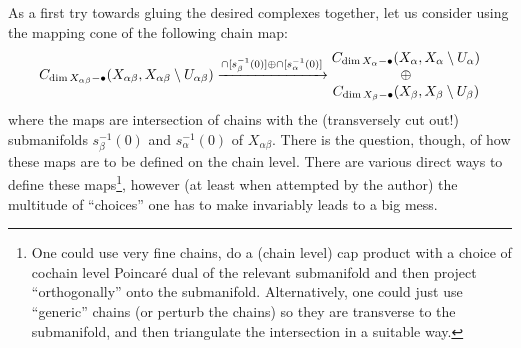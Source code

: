 \documentclass[12pt]{article}
\theoremstyle{definition}
\theoremstyle{remark}
\numberwithin{equation}{subsection}
\begin{document}
As a first try towards gluing the desired complexes together, let us consider using the mapping cone of the following chain map:
\begin{equation}\label{mappingconefirsttry}
C_{\dim X_{\alpha\beta}-\bullet}(X_{\alpha\beta},X_{\alpha\beta}\setminus U_{\alpha\beta})\xrightarrow{\cap[s_\beta^{-1}(0)]\oplus\cap[s_\alpha^{-1}(0)]}\begin{matrix}C_{\dim X_\alpha-\bullet}(X_\alpha,X_\alpha\setminus U_\alpha)\cr\oplus\cr C_{\dim X_\beta-\bullet}(X_\beta,X_\beta\setminus U_\beta)\end{matrix}
\end{equation}
where the maps are intersection of chains with the (transversely cut out!) submanifolds $s_\beta^{-1}(0)$ and $s_\alpha^{-1}(0)$ of $X_{\alpha\beta}$.  There is the question, though, of how these maps are to be defined on the chain level.  There are various direct ways to define these maps\footnote{One could use very fine chains, do a (chain level) cap product with a choice of cochain level Poincar\'e dual of the relevant submanifold and then project ``orthogonally'' onto the submanifold.  Alternatively, one could just use ``generic'' chains (or perturb the chains) so they are transverse to the submanifold, and then triangulate the intersection in a suitable way.}, however (at least when attempted by the author) the multitude of ``choices'' one has to make invariably leads to a big mess.
\end{document}
